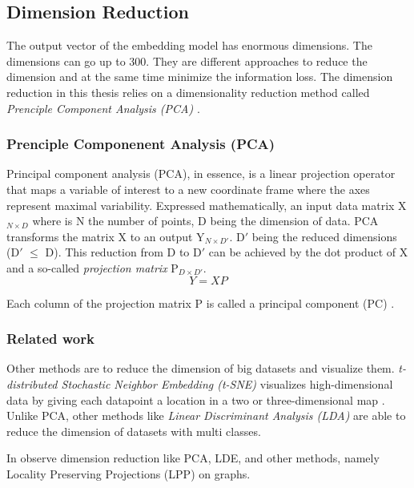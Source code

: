 \subsection{Dimension Reduction}
\label{subsec:dimension-reduction}
The output vector of the embedding model has enormous dimensions. The dimensions can go up to 300. They are different approaches to reduce the dimension and at the same time minimize the information loss. The dimension reduction in this thesis relies on a dimensionality reduction method called \emph{Prenciple Component Analysis (PCA)} \cite{wold1987principal}.

\subsubsection{Prenciple Componenent Analysis (PCA)}
\label{subsubsec:pca}
Principal component analysis (PCA), in essence, is a linear projection operator that maps a variable of interest to a new coordinate frame where the axes represent maximal variability. Expressed mathematically, an input data matrix X$_{N \times D}$ where is N the number of points, D being the dimension of data. PCA transforms the matrix X to an output Y$_{N \times D\prime}$. D$\prime$ being the reduced dimensions (D$\prime$ $\leq$ D). This reduction from D to D$\prime$ can be achieved by the dot product of X and a so-called \emph{projection matrix} P$_{D \times D\prime}$.
    \begin{equation}
        \label{PCA}
        Y = XP
    \end{equation}

Each column of the projection matrix P is called a principal component (PC) \cite{projectionMatrix}. 


\subsubsection{Related work}
\label{subsubsec:dimension-reduction-related-work}
Other methods are to reduce the dimension of big datasets and visualize them. \emph{t-distributed Stochastic Neighbor Embedding (t-SNE)} visualizes high-dimensional data by giving each datapoint a location in a two or three-dimensional map \cite{van2008visualizing}. Unlike PCA, other methods like \emph{Linear Discriminant Analysis (LDA)} \cite{balakrishnama1998linear} are able to reduce the dimension of datasets with multi classes.


In \cite{yan2006graph} observe dimension reduction like PCA, LDE, and other methods, namely Locality Preserving Projections (LPP) on graphs.


